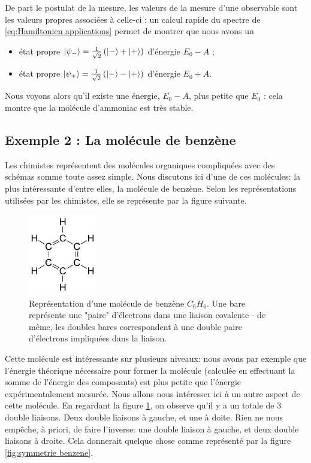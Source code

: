 \documentclass[../notesdecours.tex]{subfiles}
\begin{document}
De part le postulat de la mesure, les valeurs de la mesure d'une observable sont les valeurs propres associées à celle-ci : un calcul rapide du spectre de \eqref{eq:Hamiltonien applications} permet de montrer que nous avons un
\begin{itemize}
    \item état propre $\ket{\psi_-} = \frac{1}{\sqrt{2}}\left(\ket{-}+\ket{+}\right)$ d'énergie $E_0-A$ ;
    \item état propre $\ket{\psi_+} = \frac{1}{\sqrt{2}}\left(\ket{-}-\ket{+}\right)$ d'énergie $E_0+A$.
\end{itemize}

Nous voyons alors qu'il existe une énergie, $E_0-A$, plus petite que $E_0$ : cela montre que la molécule d'ammoniac est très stable.

\subsection*{Exemple 2 : La molécule de benzène}

\color{purple} Les chimistes représentent des molécules organiques compliquées avec des schémas somme toute assez simple. Nous discutons ici d'une de ces molécules: la plus intéressante d'entre elles, la molécule de benzène. Selon les représentations utilisées par les chimistes, elle se représente par la figure suivante.

\begin{figure}[h]
    \centering
    \includegraphics[width=3cm,scale=0.4]{Chapitre 5/Figure 3.png}
    \caption{Représentation d'une molécule de benzène $C_6H_6$. Une bare représente une "paire" d'électrons dans une liaison covalente - de même, les doubles bares correspondent à une double paire d'électrons impliquées dans la liaison.}
    \label{fig:molecule de benzene}
\end{figure}

Cette molécule est intéressante sur plusieurs niveaux: nous avons par exemple que l'énergie théorique nécessaire pour former la molécule (calculée en effectuant la somme de l'énergie des composants) est plus petite que l'énergie expérimentalement mesurée. Nous allons nous intéresser ici à un autre aspect de cette molécule. En regardant la figure \ref{fig:molecule de benzene}, on observe qu'il y a un totale de 3 double liaisons. Deux double liaisons à gauche, et une à doite. Rien ne nous empêche, à priori, de faire l'inverse: une double liaison à gauche, et deux double liaisons à droite. Cela donnerait quelque chose comme représenté par la figure \ref{fig:symmetrie benzene}.
\end{document}

